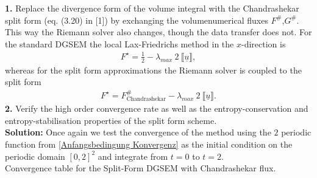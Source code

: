 \documentclass[11pt]{scrartcl}
\begin{document}
\textbf{1.} Replace the divergence form of the volume integral with the Chandrashekar split form (eq.  (3.20) in [1]) by exchanging the volumenumerical fluxes $F^\#$,$G^\#$. This way the Riemann solver also changes, though the data transfer does not. For the standard DGSEM the local Lax-Friedrichs method in the $x$-direction is 
\begin{align}
F^{\star} =\frac{1}{2}- \lambda_{max} \ 2 \ \llbracket \underline{u} \rrbracket,
\end{align}
whereas for the split form approximations the Riemann solver is coupled to the split form
\begin{align}
\label{riemannsplit}
 F^{\star} = F^\#_{\text{Chandrashekar}} - \lambda_{max} \ 2 \ \llbracket \underline{u} \rrbracket.
\end{align}
\textbf{2.} Verify the high order convergence rate as well as the entropy-conservation and entropy-stabilisation properties of the split form scheme. \\
\newline
\textbf{Solution:} Once again we test the convergence of the method using the $2$ periodic function from \ref{Anfangsbedingung Konvergenz} as the initial condition on the periodic domain $[0, 2]^2$ and integrate from $t=0$ to $t=2$.\\

Convergence table for the Split-Form DGSEM with Chandrashekar flux.
\end{document}
